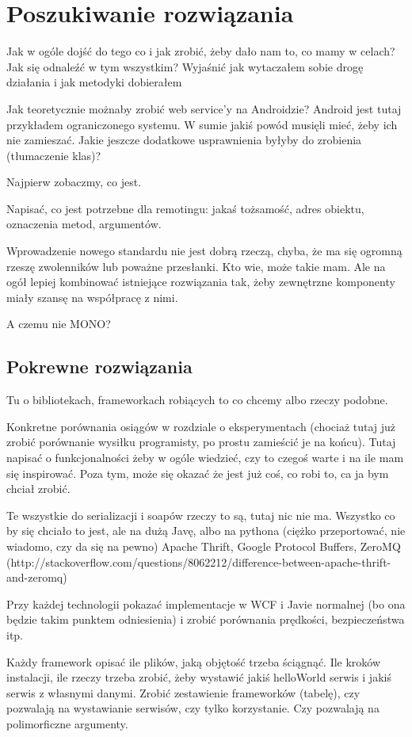 \chapter{Poszukiwanie rozwiązania}
Jak w ogóle dojść do tego  co i jak zrobić, żeby dało nam to, co mamy w celach? Jak się odnaleźć w tym wszystkim?
Wyjaśnić jak wytaczałem sobie drogę działania i jak metodyki dobierałem

Jak teoretycznie możnaby zrobić web service'y na Androidzie? Android jest tutaj przykładem ograniczonego systemu.
W sumie jakiś powód musięli mieć, żeby ich nie zamieszać. Jakie jeszcze dodatkowe usprawnienia byłyby do zrobienia (tłumaczenie klas)?

Najpierw zobaczmy, co jest.

Napisać, co jest potrzebne dla remotingu: jakaś tożsamość, adres obiektu, oznaczenia metod, argumentów.

Wprowadzenie nowego standardu nie jest dobrą rzeczą, chyba, że ma się ogromną rzeszę zwolenników lub poważne przesłanki. Kto wie, może takie mam. Ale na ogół lepiej kombinować istniejące rozwiązania tak, żeby zewnętrzne komponenty miały szansę na współpracę z nimi.

A czemu nie MONO?
\section{Pokrewne rozwiązania}
Tu o bibliotekach, frameworkach robiących to co chcemy albo rzeczy podobne.

Konkretne porównania osiągów w rozdziale o eksperymentach (chociaż tutaj już zrobić porównanie wysiłku programisty, po prostu zamieścić je na końcu). Tutaj napisać o funkcjonalności żeby w ogóle wiedzieć, czy to czegoś warte i na ile mam się inspirować. Poza tym, może się okazać że jest już coś, co robi to, ca ja bym chciał zrobić.

Te wszystkie do serializacji i soapów rzeczy to są, tutaj nic nie ma. Wszystko co by się chciało to jest, ale na dużą Javę, albo na pythona (ciężko przeportować, nie wiadomo, czy da się na pewno) Apache Thrift, Google Protocol Buffers, ZeroMQ (http://stackoverflow.com/questions/8062212/difference-between-apache-thrift-and-zeromq)

Przy każdej technologii pokazać implementacje w WCF i Javie normalnej (bo ona będzie takim punktem odniesienia) i zrobić porównania prędkości, bezpieczeństwa itp.

Każdy framework opisać ile plików, jaką objętość trzeba ściągnąć. Ile kroków instalacji, ile rzeczy trzeba zrobić, żeby wystawić jakiś helloWorld serwis i jakiś serwis z własnymi danymi. Zrobić zestawienie frameworków (tabelę), czy pozwalają na wystawianie serwisów, czy tylko korzystanie. Czy pozwalają na polimorficzne argumenty.

